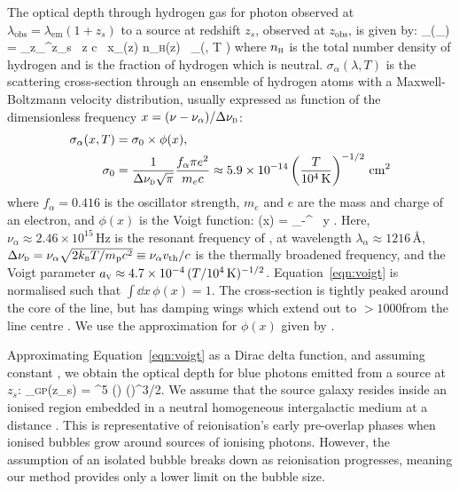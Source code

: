 \documentclass[fleqn,usenatbib]{mnras}
\begin{document}
The \lya optical depth through hydrogen gas for photon observed at $\lambda_\mathrm{obs} = \lambda_\mathrm{em}(1+z_s)$ to a source at redshift $z_s$, observed at $z_\mathrm{obs}$, is given by:
%
\BE \label{eqn:optdepth}
\tau_\alpha(\lambda_) = \int_{z_}^{z_s} \, \dd z \; c  \, x_\HI(z) n_\textsc{h}(z)  \, \sigma_\alpha\left(, T \right)
\EE
%
where $n_\textsc{h}$ is the total number density of hydrogen and \xHI is the fraction of hydrogen which is neutral. $\sigma_\alpha(\lambda, T)$ is the \lya scattering cross-section through an ensemble of hydrogen atoms with a Maxwell-Boltzmann velocity distribution, usually expressed as function of the dimensionless frequency $x = (\nu - \nu_\alpha)/\Delta \nu_\textsc{d}$:
%
\begin{align} \label{eqn:crosssection}
\sigma_\alpha(x, T) &= \sigma_0 \times \phi(x),\\
\sigma_0 &= \frac{1}{\Delta \nu_\textsc{d} \sqrt{\pi}} \frac{f_\alpha \pi e^2}{m_e c} \approx 5.9 \times 10^{-14} \left(\frac{T}{10^4\,\mathrm{K}}\right)^{-1/2} \cm^2 \nonumber
\end{align}
%
where $f_\alpha = 0.416$ is the \lya oscillator strength, $m_e$ and $e$ are the mass and charge of an electron, and $\phi(x)$ is the Voigt function:
%
\BE \label{eqn:voigt}
\phi(x) =  \int_{-\infty}^{\infty} \, \dd y \; .
\EE
%
Here, $\nu_\alpha \approx 2.46\times10^{15}$\,Hz is the resonant frequency of \lya, at wavelength $\lambda_\alpha \approx 1216$\,\AA, $\Delta \nu_\textsc{d} = \nu_\alpha \sqrt{2k_\textsc{b}T/m_\mathrm{p}c^2} \equiv \nu_\alpha v_\textrm{th}/c$ is the thermally broadened frequency, and the Voigt parameter $a_\textsc{v} \approx 4.7\times10^{-4}\,(T/10^4\,\mathrm{K})^{-1/2}$. Equation~\eqref{eqn:voigt} is normalised such that $\int \dd x \, \phi(x) =1$. The cross-section is tightly peaked around the core of the line, but has damping wings which extend out to $>1000$\kms from the line centre \citep[e.g.,][]{Dijkstra2014}. We use the approximation for $\phi(x)$ given by \citet{Tasitsiomi2006}.

Approximating Equation~\eqref{eqn:voigt} as a Dirac delta function, and assuming constant \xHI, we obtain the \citet{Gunn1965} optical depth for blue photons emitted from a source at $z_s$:
%
\BE \label{eqn:tau_GP}
\tau_\textsc{gp}(z_s) =   ^5 \xHI \left(\right) \left(\right)^{3/2}.
\EE
%
We assume that the source galaxy resides inside an ionised region embedded in a neutral homogeneous intergalactic medium at a distance \Rion. This is representative of reionisation's early pre-overlap phases when ionised bubbles grow around sources of ionising photons. However, the assumption of an isolated bubble breaks down as reionisation progresses, meaning our method provides only a lower limit on the bubble size.
\end{document}
